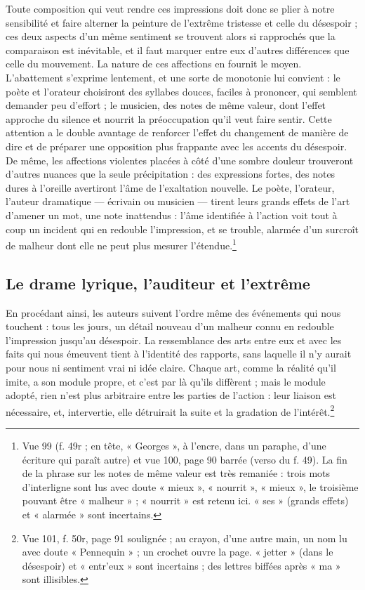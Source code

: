 \documentclass[11pt,a4paper]{article}
\begin{document}
Toute composition qui veut rendre ces impressions doit donc se plier à notre
sensibilité et faire alterner la peinture de l'extrême tristesse et celle du
désespoir ; ces deux aspects d'un même sentiment se trouvent alors si rapprochés
que la comparaison est inévitable, et il faut marquer entre eux d'autres
différences que celle du mouvement. La nature de ces affections en fournit le
moyen. L'abattement s'exprime lentement, et une sorte de monotonie lui convient :
le poète et l'orateur choisiront des syllabes douces, faciles à prononcer, qui
semblent demander peu d'effort ; le musicien, des notes de même valeur, dont
l'effet approche du silence et nourrit la préoccupation qu'il veut faire sentir.
Cette attention a le double avantage de renforcer l'effet du changement de
manière de dire et de préparer une opposition plus frappante avec les accents du
désespoir. De même, les affections violentes placées à côté d'une sombre douleur
trouveront d'autres nuances que la seule précipitation : des expressions fortes,
des notes dures à l'oreille avertiront l'âme de l'exaltation nouvelle. Le poète,
l'orateur, l'auteur dramatique — écrivain ou musicien — tirent leurs grands effets
de l'art d'amener un mot, une note inattendus : l'âme identifiée à l'action voit
tout à coup un incident qui en redouble l'impression, et se trouble, alarmée d'un
surcroît de malheur dont elle ne peut plus mesurer l'étendue.\footnote{Vue 99
(f. 49r ; en tête, « Georges », à l'encre, dans un paraphe, d'une écriture qui
paraît autre) et vue 100, page 90 barrée (verso du f. 49). La fin de la phrase
sur les notes de même valeur est très remaniée : trois mots d'interligne sont lus
avec doute « mieux », « nourrit », « mieux », le troisième pouvant être
« malheur » ; « nourrit » est retenu ici. « ses » (grands effets) et « alarmée »
sont incertains.}

\subsection*{Le drame lyrique, l'auditeur et l'extrême}

En procédant ainsi, les auteurs suivent l'ordre même des événements qui nous
touchent : tous les jours, un détail nouveau d'un malheur connu en redouble
l'impression jusqu'au désespoir. La ressemblance des arts entre eux et avec les
faits qui nous émeuvent tient à l'identité des rapports, sans laquelle il n'y
aurait pour nous ni sentiment vrai ni idée claire. Chaque art, comme la réalité
qu'il imite, a son module propre, et c'est par là qu'ils diffèrent ; mais le
module adopté, rien n'est plus arbitraire entre les parties de l'action : leur
liaison est nécessaire, et, intervertie, elle détruirait la suite et la
gradation de l'intérêt.\footnote{Vue 101, f. 50r, page 91 soulignée ; au crayon,
d'une autre main, un nom lu avec doute « Pennequin » ; un crochet ouvre la page.
« jetter » (dans le désespoir) et « entr'eux » sont incertains ; des lettres
biffées après « ma » sont illisibles.}
\end{document}
